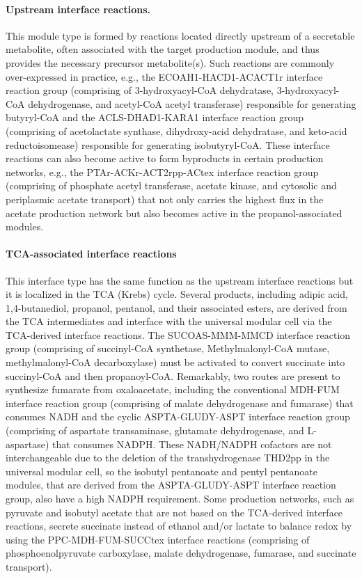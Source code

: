 \paragraph{Upstream interface reactions.}
This module  type is formed by reactions located directly upstream of a secretable metabolite, often associated with the target production module, and thus provides the necessary precursor metabolite(s). Such reactions are commonly over-expressed in practice, e.g., the ECOAH1-HACD1-ACACT1r interface reaction group (comprising of 3-hydroxyacyl-CoA dehydratase, 3-hydroxyacyl-CoA dehydrogenase, and acetyl-CoA acetyl transferase) responsible for generating butyryl-CoA and  the ACLS-DHAD1-KARA1 interface reaction group (comprising of acetolactate synthase, dihydroxy-acid dehydratase, and keto-acid reductoisomease) responsible for generating isobutyryl-CoA.
These interface reactions can also become active to form byproducts in certain production networks, e.g., the PTAr-ACKr-ACT2rpp-ACtex interface reaction group (comprising of phosphate acetyl transferase, acetate kinase, and cytosolic and periplasmic acetate transport) that not only carries the highest flux in the acetate production network but also becomes active in the propanol-associated modules.

\paragraph{TCA-associated interface reactions}
This interface type has the same function as the upstream interface reactions but it is localized in the TCA (Krebs) cycle.
Several products, including adipic acid, 1,4-butanediol, propanol, pentanol, and their associated esters, are derived from the TCA intermediates and interface with the universal modular cell via the TCA-derived interface reactions.
The SUCOAS-MMM-MMCD interface reaction group (comprising of succinyl-CoA synthetase, Methylmalonyl-CoA mutase, methylmalonyl-CoA decarboxylase) must be activated to convert succinate into succinyl-CoA and then propanoyl-CoA. Remarkably, two routes are present to synthesize fumarate from oxaloacetate, including the conventional MDH-FUM interface reaction group (comprising of malate dehydrogenase and fumarase) that consumes NADH and the cyclic ASPTA-GLUDY-ASPT interface reaction group (comprising of aspartate transaminase, glutamate dehydrogenase, and L-aspartase) that consumes NADPH. These NADH/NADPH cofactors are not interchangeable due to the deletion of the transhydrogenase THD2pp in the universal modular cell, so the isobutyl pentanoate and pentyl pentanoate modules, that are derived from the ASPTA-GLUDY-ASPT interface reaction group, also have a high NADPH requirement. Some production networks, such as pyruvate and isobutyl acetate that are not based on the TCA-derived interface reactions, secrete succinate instead of ethanol and/or lactate to balance redox by using the PPC-MDH-FUM-SUCCtex interface reactions (comprising of phosphoenolpyruvate carboxylase, malate dehydrogenase, fumarase, and succinate transport).

